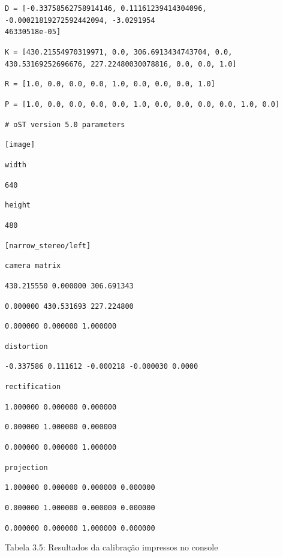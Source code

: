 {\setlength{\parindent}{0cm}

\texttt{D = {[}-0.33758562758914146, 0.11161239414304096, -0.00021819272592442094, -3.0291954\\46330518e-05{]}}

 \texttt{K = {[}430.21554970319971, 0.0, 306.6913434743704, 0.0, 430.53169252696676, 227.22480030078816, 0.0, 0.0, 1.0{]}}

\texttt{R = {[}1.0, 0.0, 0.0, 0.0, 1.0, 0.0, 0.0, 0.0, 1.0{]}}

\texttt{P = {[}1.0, 0.0, 0.0, 0.0, 0.0, 1.0, 0.0, 0.0, 0.0, 0.0, 1.0, 0.0{]}}

 \texttt{\# oST version 5.0 parameters}


 \texttt{{[}image{]}}


 \texttt{width}

 \texttt{640}



 \texttt{height}

 \texttt{480}



 \texttt{{[}narrow\_stereo/left{]}}


 \texttt{camera matrix}

 \texttt{430.215550 0.000000 306.691343}

 \texttt{0.000000 430.531693 227.224800}

 \texttt{0.000000 0.000000 1.000000}


 \texttt{distortion}

 \texttt{-0.337586 0.111612 -0.000218 -0.000030 0.0000}


 \texttt{rectification}

 \texttt{1.000000 0.000000 0.000000}

 \texttt{0.000000 1.000000 0.000000}

 \texttt{0.000000 0.000000 1.000000}


 \texttt{projection}

 \texttt{1.000000 0.000000 0.000000 0.000000}

 \texttt{0.000000 1.000000 0.000000 0.000000}

 \texttt{0.000000 0.000000 1.000000 0.000000}
}

Tabela 3.5: Resultados da calibração impressos no console
 
